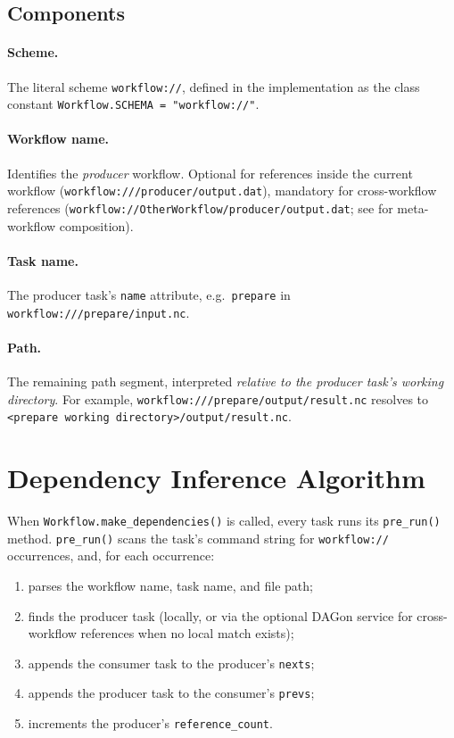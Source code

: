 \subsection{Components}

\paragraph{Scheme.} The literal scheme \texttt{workflow://}, defined in the
implementation as the class constant \texttt{Workflow.SCHEMA = "workflow://"}.

\paragraph{Workflow name.} Identifies the \emph{producer} workflow. Optional
for references inside the current workflow (\texttt{workflow:///producer/output.dat}),
mandatory for cross-workflow references
(\texttt{workflow://OtherWorkflow/producer/output.dat}; see
 for meta-workflow composition).

\paragraph{Task name.} The producer task's \texttt{name} attribute, e.g.\
\texttt{prepare} in \texttt{workflow:///prepare/input.nc}.

\paragraph{Path.} The remaining path segment, interpreted \emph{relative to
the producer task's working directory}. For example,
\texttt{workflow:///prepare/output/result.nc} resolves to
\texttt{<prepare working directory>/output/result.nc}.

\section{Dependency Inference Algorithm}

When \texttt{Workflow.make\_dependencies()} is called, every task runs its
\texttt{pre\_run()} method. \texttt{pre\_run()} scans the task's command
string for \texttt{workflow://} occurrences, and, for each occurrence:

\begin{enumerate}[leftmargin=1.6em]
  \item parses the workflow name, task name, and file path;
  \item finds the producer task (locally, or via the optional DAGon service
    for cross-workflow references when no local match exists);
  \item appends the consumer task to the producer's \texttt{nexts};
  \item appends the producer task to the consumer's \texttt{prevs};
  \item increments the producer's \texttt{reference\_count}.
\end{enumerate}

